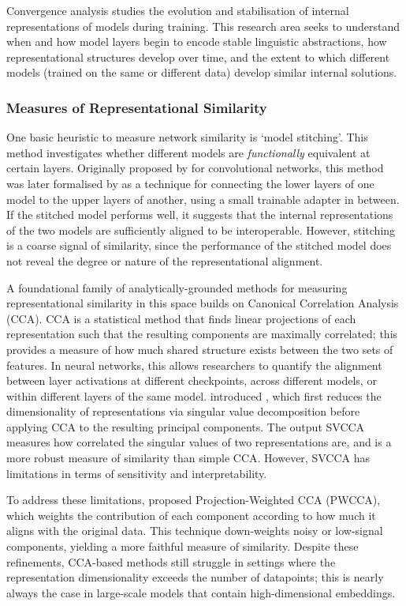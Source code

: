 Convergence analysis studies the evolution and stabilisation of internal representations of models during training. This research area seeks to understand when and how model layers begin to encode stable linguistic abstractions, how representational structures develop over time, and the extent to which different models (trained on the same or different data) develop similar internal solutions.

\subsubsection{Measures of Representational Similarity}

One basic heuristic to measure network similarity is `model stitching'. This method investigates whether different models are \textit{functionally} equivalent at certain layers. Originally proposed by \citet{lenc2015understanding} for convolutional networks, this method was later formalised by \citet{bansal2021stitch} as a technique for connecting the lower layers of one model to the upper layers of another, using a small trainable adapter in between. If the stitched model performs well, it suggests that the internal representations of the two models are sufficiently aligned to be interoperable. However, stitching is a coarse signal of similarity, since the performance of the stitched model does not reveal the degree or nature of the representational alignment.

A foundational family of analytically-grounded methods for measuring representational similarity in this space builds on Canonical Correlation Analysis (CCA). CCA is a statistical method that finds linear projections of each representation such that the resulting components are maximally correlated; this provides a measure of how much shared structure exists between the two sets of features. In neural networks, this allows researchers to quantify the alignment between layer activations at different checkpoints, across different models, or within different layers of the same model. \citet{raghu2017svcca} introduced , which first reduces the dimensionality of representations via singular value decomposition before applying CCA to the resulting principal components. The output SVCCA measures how correlated the singular values of two representations are, and is a more robust measure of similarity than simple CCA. However, SVCCA has limitations in terms of sensitivity and interpretability.

To address these limitations, \citet{morcos2018pwcca} proposed Projection-Weighted CCA (PWCCA), which weights the contribution of each component according to how much it aligns with the original data. This technique down-weights noisy or low-signal components, yielding a more faithful measure of similarity. Despite these refinements, CCA-based methods still struggle in settings where the representation dimensionality exceeds the number of datapoints; this is nearly always the case in large-scale models that contain high-dimensional embeddings.

